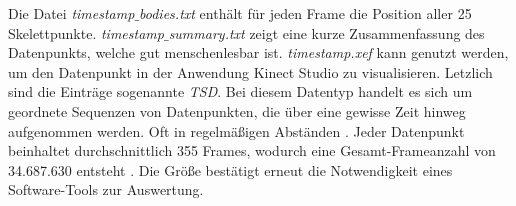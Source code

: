 Die Datei \emph{timestamp$\_$bodies.txt} enthält für jeden Frame die Position aller 25 Skelettpunkte.
\emph{timestamp$\_$summary.txt} zeigt eine kurze Zusammenfassung des Datenpunkts, welche gut menschenlesbar ist.
\emph{timestamp.xef} kann genutzt werden, um den Datenpunkt in der Anwendung Kinect Studio zu visualisieren.
Letzlich sind die Einträge sogenannte \emph{\ac{TSD}}.
Bei diesem Datentyp handelt es sich um geordnete Sequenzen von Datenpunkten,
die über eine gewisse Zeit hinweg aufgenommen werden.
Oft in regelmäßigen Abständen \citep{ali_clustering_2019}.
Jeder Datenpunkt beinhaltet durchschnittlich 355 Frames,
wodurch eine Gesamt-Frameanzahl von 34.687.630 entsteht \citep{temiz_konzeption_2022}.
Die Größe bestätigt erneut die Notwendigkeit eines Software-Tools zur Auswertung.